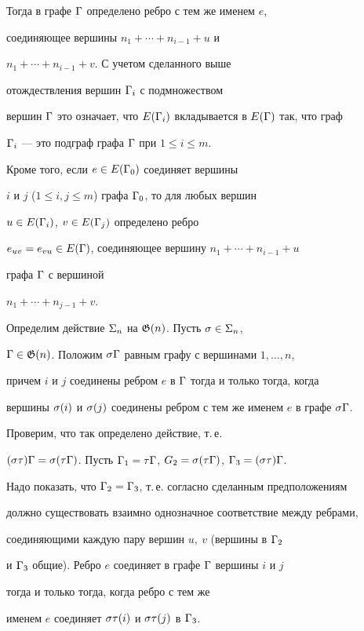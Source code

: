 Тогда в графе ${\Gamma}$ определено ребро с тем же именем $e$, 


соединяющее вершины $n_1+\dotsb +n_{i-1}+u$ и 


$n_1+\dotsb +n_{i-1}+v$. С учетом сделанного выше 


отождествления вершин ${\Gamma}_i$ с подмножеством


вершин ${\Gamma}$ это означает, что $E({\Gamma}_i)$ вкладывается в $E({\Gamma})$ так, что граф


${\Gamma}_i$ --- это подграф графа ${\Gamma}$ при $1\leq i\leq m$. 





Кроме того, если $e\in E({\Gamma}_0)$ соединяет вершины 


$i$ и $j$ ($1\leq i, j\leq m$) графа ${\Gamma}_0$, то для любых вершин


$u\in E({\Gamma}_i)$, $v\in E({\Gamma}_j)$ определено ребро


$e_{uv}=e_{vu}\in E({\Gamma})$, соединяющее вершину $n_1+\dotsb +n_{i-1}+u$


графа ${\Gamma}$ с вершиной


$n_1+\dotsb +n_{j-1}+v$.





Определим действие $\Sigma_n$ на ${\frak G} (n)$. Пусть $\sigma\in\Sigma_n$,


${\Gamma}\in{\frak G} (n)$. Положим $\sigma{\Gamma}$ равным графу с вершинами $1,\dotsc , n$, 


причем $i$ и $j$ соединены ребром $e$ в ${\Gamma}$ тогда и только тогда, когда 


вершины $\sigma (i)$ и $\sigma (j)$ соединены ребром с тем же именем $e$ в графе $\sigma{\Gamma}$.





Проверим, что так определено действие, т.\,е.


$(\sigma\tau ){\Gamma}=\sigma (\tau{\Gamma})$. Пусть ${\Gamma}_1=\tau{\Gamma}$, $G_2=\sigma (\tau{\Gamma})$, ${\Gamma}_3=(\sigma\tau ){\Gamma}$.


Надо показать, что ${\Gamma}_2={\Gamma}_3$, т.\,е. согласно сделанным предположениям 


должно существовать взаимно однозначное соответствие между ребрами, 


соединяющими каждую пару вершин $u,\ v$ (вершины в ${\Gamma}_2$ 


и ${\Gamma}_3$ общие). Ребро $e$ соединяет в графе ${\Gamma}$ вершины $i$ и $j$ 


тогда и только тогда, когда ребро с тем же  


именем $e$ соединяет $\sigma\tau (i)$ и $\sigma\tau (j)$ в ${\Gamma}_3$.





